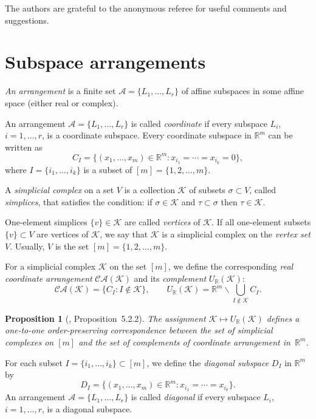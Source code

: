 \documentclass[a4paper,12pt]{amsart}
\newcommand{\K}{\mathcal K}
\newcommand{\RR}{\mathbb R}
\newtheorem{proposition}[formula]{Proposition}
\theoremstyle{definition}
\theoremstyle{remark}
\numberwithin{equation}{section}
\begin{document}
The authors are grateful to the anonymous referee for useful comments and suggestions.



\section{Subspace arrangements}
{\it An arrangement} is a finite set $\mathcal{A} = \{L_1, \ldots, L_r \}$ of affine subspaces in some affine space (either real or complex).

An arrangement $\mathcal{A} = \{L_1, \ldots, L_r \}$ is called \textit{coordinate}
if every subspace $L_i$, $i = 1, \ldots, r$, is a coordinate subspace.
Every coordinate subspace in $\RR^m$ can be written as
\[
  C_I = \{(x_1, \ldots, x_m) \in \RR^m \colon x_{i_1} = \cdots = x_{i_k} = 0 \}, 
\]  
where $I = \{i_1, \ldots, i_k \}$ is a subset of $[m] = \{1, 2, \ldots, m \}$.

A \textit{simplicial complex} on a set $V$ is a collection $\K$ of subsets $\sigma \subset V$, called \emph{simplices}, 
that satisfies the condition: if $\sigma \in \K$ and $\tau \subset \sigma$ then $\tau \in \K$.

One-element simplices $\{v\} \in \K$ are called \textit{vertices} of $\K$. If all one-element subsets $\{v\} \subset V$ are vertices of $\K$,
we say that $\K$ is a simplicial complex on the \emph{vertex set} $V$. Usually, $V$ is the set $[m] = \{1, 2, \ldots, m \}$.

For a simplicial complex $\K$ on the set $[m]$, we define the corresponding \textit{real coordinate arrangement} $\mathcal{CA}(\K)$ and its \emph{complement}
$U_{\RR}(\K)$:
\[
  \mathcal{CA}(\K) = \{C_I \colon I \notin \K \},\qquad
  U_{\RR}(\K) = \RR^m \backslash \bigcup_{I \notin \K} C_I.
\]

\begin{proposition}[\cite{BP00}, Proposition~5.2.2]
The assignment $\K \mapsto U_\RR(\K)$ defines a one-to-one order-preserving correspondence between the set
of simplicial complexes on $[m]$ and the set of complements of coordinate arrangement in~$\RR^m$.
\end{proposition}

For each subset $I = \{ i_1, \ldots, i_k\} \subset [m]$, we define the \textit{diagonal subspace} $D_I$ in $\RR^m$ by
\[
 D_I = \{(x_1, \ldots, x_m) \in \RR^m \colon x_{i_1} = \cdots = x_{i_k} \}. 
\] 
An arrangement $\mathcal{A} = \{L_1, \ldots, L_r \}$ is called \emph{diagonal} if every subspace $L_i$, $i = 1, \ldots, r$,
is a diagonal subspace.
\end{document}
